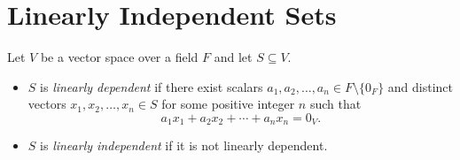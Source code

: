 \section{Linearly Independent Sets}
\begin{definition}\label{def:linear-independence}
  Let $V$ be a vector space over a field $F$ and let $S \subseteq V$.
  \begin{itemize}
    \item $S$ is \emph{linearly dependent} if there exist scalars
      $a_1, a_2, \dots, a_n \in F \setminus \{0_F\}$ and distinct vectors
      $x_1, x_2, \dots, x_n \in S$ for some positive integer $n$ such that
      \begin{equation*}
        a_1x_1 + a_2x_2 + \cdots + a_nx_n = 0_V.
      \end{equation*}
    \item $S$ is \emph{linearly independent} if it is not linearly dependent.
  \end{itemize}
\end{definition}

